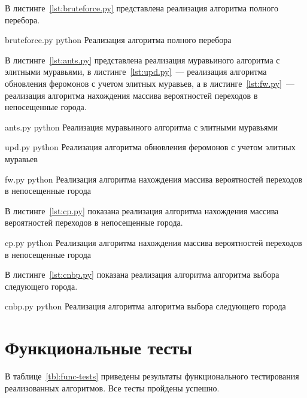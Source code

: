В листинге~\ref{lst:bruteforce.py} представлена реализация алгоритма полного перебора.

	{bruteforce.py}
	{python}
	{Реализация алгоритма полного перебора}
	
В листинге~\ref{lst:ants.py} представлена реализация муравьиного алгоритма с элитными муравьями, в листинге~\ref{lst:upd.py}~--- реализация алгоритма обновления феромонов с учетом элитных муравьев, а в листинге~\ref{lst:fw.py}~--- реализация алгоритма нахождения массива вероятностей переходов в непосещенные города.

	{ants.py}
	{python}
	{Реализация муравьиного алгоритма с элитными муравьями}
	
	{upd.py}
	{python}
	{Реализация алгоритма обновления феромонов с учетом элитных муравьев}

	{fw.py}
	{python}
	{Реализация алгоритма нахождения массива вероятностей переходов в непосещенные города}
	
В листинге~\ref{lst:cp.py} показана реализация алгоритма нахождения массива вероятностей переходов в непосещенные города.

	{cp.py}
	{python}
	{Реализация алгоритма нахождения массива вероятностей переходов в непосещенные города}
	
В листинге~\ref{lst:cnbp.py} показана реализация алгоритма алгоритма выбора следующего города.

	{cnbp.py}
	{python}
	{Реализация алгоритма алгоритма выбора следующего города}

\section{Функциональные тесты}

В таблице~\ref{tbl:func-tests} приведены результаты функционального тестирования реализованных алгоритмов.
Все тесты пройдены успешно.

